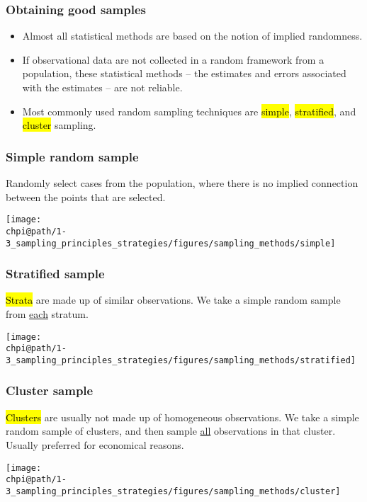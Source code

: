 \documentclass[slidestop,compress,mathserif]{beamer}
\makeatletter
\def\chpi@path{../../Chp 1}  %
\makeatother
\begin{document}

\begin{frame}
	\frametitle{Obtaining good samples}

	\begin{itemize}
		\item Almost all statistical methods are based on the notion of implied randomness. 
		\item If observational data are not collected in a random framework from a population, these statistical methods -- the estimates and errors associated with the estimates -- are not reliable.
		\item Most commonly used random sampling techniques are \hl{simple}, \hl{stratified}, and \hl{cluster} sampling.
	\end{itemize}

\end{frame}


\begin{frame}
	\frametitle{Simple random sample}

	Randomly select cases from the population, where there is no implied connection between the points that are selected.

	\begin{center}
	\texttt{[image: \\chpi@path/1-3\_sampling\_principles\_strategies/figures/sampling\_methods/simple]}
	\end{center}

\end{frame}


\begin{frame}
	\frametitle{Stratified sample}

	\hl{Strata} are made up of similar observations. We take a simple random sample from \underline{each} stratum.

	\begin{center}
	\texttt{[image: \\chpi@path/1-3\_sampling\_principles\_strategies/figures/sampling\_methods/stratified]}
	\end{center}

\end{frame}


\begin{frame}
	\frametitle{Cluster sample}

	\hl{Clusters} are usually not made up of homogeneous observations. We take a simple random sample of clusters, and then sample \underline{all} observations in that cluster. Usually preferred for economical reasons.

	\begin{center}
	\texttt{[image: \\chpi@path/1-3\_sampling\_principles\_strategies/figures/sampling\_methods/cluster]}
	\end{center}

\end{frame}
\end{document}
